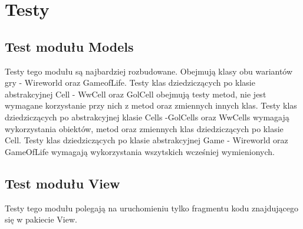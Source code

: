 \documentclass[10pt, oneside]{article}
\begin{document}
\section {Testy}

\subsection {Test modułu Models}
Testy tego modułu są najbardziej rozbudowane. Obejmują klasy obu wariantów gry - Wireworld oraz GameofLife. Testy klas dziedziczących po klasie abstrakcyjnej Cell - WwCell oraz GolCell obejmują testy metod, nie jest wymagane korzystanie przy nich z metod oraz zmiennych innych klas. Testy klas dziedziczących po abstrakcyjnej klasie Cells -GolCells oraz WwCells wymagają wykorzystania obiektów, metod oraz zmiennych klas dziedziczących po klasie Cell. Testy klas dziedziczących po klasie abstrakcyjnej Game - Wireworld oraz GameOfLife wymagają wykorzystania wszytskich wcześniej wymienionych.

\subsection {Test modułu View}
Testy tego modułu polegają na uruchomieniu tylko fragmentu kodu znajdującego się w pakiecie View. 
\end{document}
